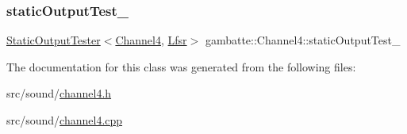 \mbox{\label{classgambatte_1_1Channel4_a2ae503294dbb4386f217e90bb08aaa6d}} 
\subsubsection{\texorpdfstring{static\+Output\+Test\+\_\+}{staticOutputTest\_}}
{\footnotesize\ttfamily \hyperlink{classgambatte_1_1StaticOutputTester}{Static\+Output\+Tester}$<$\hyperlink{classgambatte_1_1Channel4}{Channel4}, \hyperlink{classgambatte_1_1Channel4_1_1Lfsr}{Lfsr}$>$ gambatte\+::\+Channel4\+::static\+Output\+Test\+\_\+\hspace{0.3cm}{\ttfamily [private]}}



The documentation for this class was generated from the following files\+:\begin{DoxyCompactItemize}
\item 
src/sound/\hyperlink{channel4_8h}{channel4.\+h}\item 
src/sound/\hyperlink{channel4_8cpp}{channel4.\+cpp}\end{DoxyCompactItemize}
